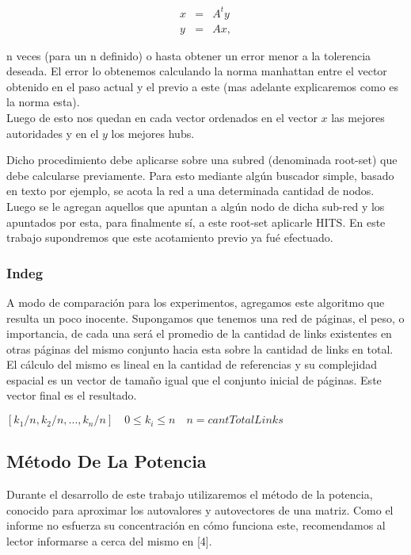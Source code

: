 \begin{eqnarray}
x & = & A^ty \label{eq:auth-update-math} \\
y & = & Ax, \label{eq:hub-update-math} 
\end{eqnarray}

n veces (para un n definido) o hasta obtener un error menor a la tolerencia deseada. El error lo obtenemos calculando la norma manhattan entre el vector obtenido en el paso actual y el previo a este (mas adelante explicaremos como es la norma esta).\\
Luego de esto nos quedan en cada vector ordenados en el vector $x$ las mejores autoridades y en el $y$ los mejores hubs.

Dicho procedimiento debe aplicarse sobre una subred (denominada root-set) que debe calcularse previamente. Para esto mediante algún buscador simple, basado en texto por ejemplo, se acota la red a una determinada cantidad de nodos. Luego se le agregan aquellos que apuntan a algún nodo de dicha sub-red y los apuntados por esta, para finalmente sí, a este root-set aplicarle HITS. En este trabajo supondremos que este acotamiento previo ya fué efectuado.


\subsubsection{Indeg}
A modo de comparación para los experimentos, agregamos este algoritmo que resulta un poco inocente. Supongamos que tenemos una red de páginas, el peso, o importancia, de cada una será el promedio de la cantidad de links existentes en otras páginas del mismo conjunto hacia esta sobre la cantidad de links en total. El cálculo del mismo es lineal en la cantidad de referencias y su complejidad espacial es un vector de tamaño igual que el conjunto inicial de páginas. Este vector final es el resultado.

\begin{center}
$[k_1/n, k_2/n, ..., k_n/n]\quad 0 \leq k_i \leq n \quad n = cantTotalLinks$
\end{center}

\subsection{Método De La Potencia}
Durante el desarrollo de este trabajo utilizaremos el método de la potencia, conocido para aproximar los autovalores y autovectores de una matriz. Como el informe no esfuerza su concentración en cómo funciona este, recomendamos al lector informarse a cerca del mismo en [4].

